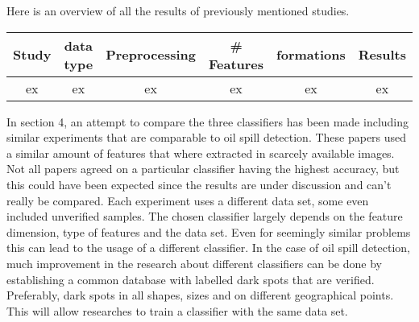 \newpage
Here is an overview of all the results of previously mentioned studies.

\begin{table*}[t]
\centering
\begin{tabular}{*{6}{c}}
  Study & data type & Preprocessing & \# Features & formations & Results \\
    \hline
  ex & ex & ex & ex & ex & ex \\  
\end{tabular}
\end{table*}

In section 4, an attempt to compare the three classifiers has been made including similar experiments that are comparable to oil spill detection. These papers used a similar amount of features that where extracted in scarcely available images. \\ Not all papers agreed on a particular classifier having the highest accuracy, but this could have been expected since the results are under discussion and can't really be compared. Each experiment uses a different data set, some even included unverified samples. The chosen classifier largely depends on the feature dimension, type of features and the data set. Even for seemingly similar problems this can lead to the usage of a different classifier. In the case of oil spill detection, much improvement in the research about different classifiers can be done by establishing a common database with labelled dark spots that are verified. Preferably, dark spots in all shapes, sizes and on different geographical points. This will allow researches to train a classifier with the same data set.